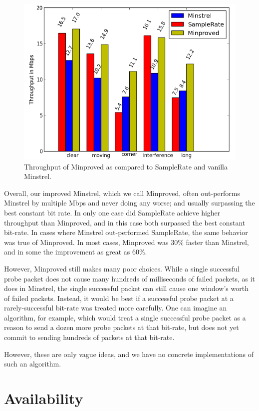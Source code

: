 \documentclass[twocolumn,10pt]{article}
\begin{document}
\begin{figure}[htb]
  \includegraphics[width=\linewidth]{mnVSspVSmp1.png}
  \caption{Throughput of Minproved as compared to SampleRate and
    vanilla Minstrel.}
\label{figure:4}
\end{figure}

Overall, our improved Minstrel, which we call Minproved, often
out-performs Minstrel by multiple Mbps and never doing any worse; and
usually surpassing the best constant bit rate.  In only one case did
SampleRate achieve higher throughput than Minproved, and in this case
both surpassed the best constant bit-rate.  In cases where Minstrel
out-performed SampleRate, the same behavior was true of Minproved.  In
most cases, Minproved was $30\%$ faster than Minstrel, and in some the
improvement as great as $60\%$.

However, Minproved still makes many poor choices.  While a single
successful probe packet does not cause many hundreds of milliseconds
of failed packets, as it does in Minstrel, the single successful
packet can still cause one window's worth of failed packets.  Instead,
it would be best if a successful probe packet at a rarely-successful
bit-rate was treated more carefully.  One can imagine an algorithm,
for example, which would treat a single successful probe packet as a
reason to send a dozen more probe packets at that bit-rate, but does
not yet commit to sending hundreds of packets at that bit-rate.

However, these are only vague ideas, and we have no concrete
implementations of such an algorithm.


\section{Availability}
\end{document}
